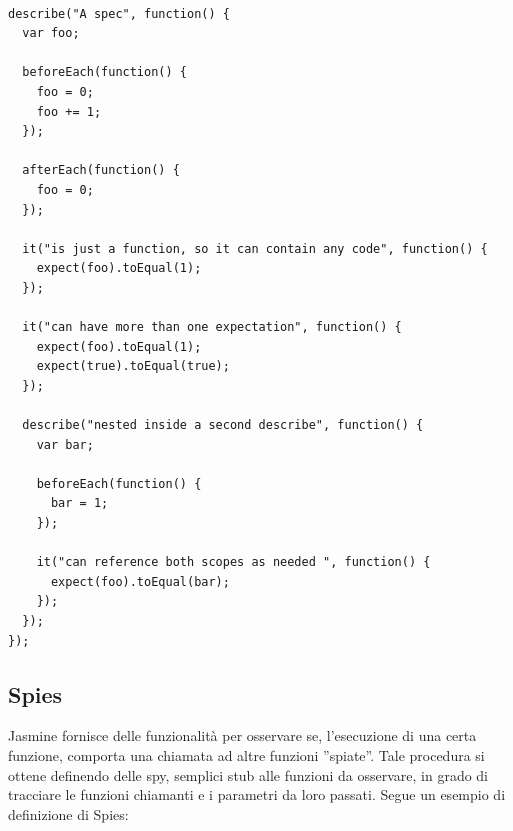 \documentclass[10pt,a4paper,onecolumn]{article}
\begin{document}
\begin{lstlisting}

describe("A spec", function() {
  var foo;

  beforeEach(function() {
    foo = 0;
    foo += 1;
  });

  afterEach(function() {
    foo = 0;
  });

  it("is just a function, so it can contain any code", function() {
    expect(foo).toEqual(1);
  });

  it("can have more than one expectation", function() {
    expect(foo).toEqual(1);
    expect(true).toEqual(true);
  });

  describe("nested inside a second describe", function() {
    var bar;

    beforeEach(function() {
      bar = 1;
    });

    it("can reference both scopes as needed ", function() {
      expect(foo).toEqual(bar);
    });
  });
});

\end{lstlisting}

\subsection{Spies}

Jasmine fornisce delle funzionalità per osservare se, l'esecuzione di una certa funzione, comporta una chiamata ad altre funzioni ''spiate''. Tale procedura si ottene definendo delle spy, semplici stub alle funzioni da osservare, in grado di tracciare le funzioni chiamanti e i parametri da loro passati. Segue un esempio di definizione di Spies:
\end{document}

